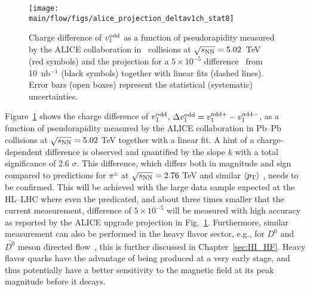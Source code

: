 \begin{figure}[!htb]
\begin{center}
\texttt{[image: \\main/flow/figs/alice\_projection\_deltav1ch\_stat8]}
\caption{
Charge difference of $v_1^{\rm odd}$ as a function of pseudorapidity measured 
  by the ALICE collaboration in \pbpb\ collisions at $\sqrt{s_{\mathrm{NN}}}=5.02$~TeV~\cite{Margutti:2017lup} 
  (red symbols) and the projection for a $5 \times 10^{-5}$ difference~\cite{Gursoy:2014aka} 
  from 10~nb$^{-1}$ (black symbols) together with linear fits (dashed lines). 
Error bars (open boxes) represent the statistical (systematic) uncertainties.}
\label{fig:alice_delta_v1}
\end{center}
\end{figure}


Figure~\ref{fig:alice_delta_v1} shows the charge difference of $v_1^{\rm odd}$, 
$\Delta v_1^{\rm odd}=v_1^{\rm odd +} - v_1^{\rm odd -}$, as a function of pseudorapidity measured by the ALICE collaboration in Pb--Pb collisions 
at $\sqrt{s_{\mathrm{NN}}}=5.02$ TeV \cite{Margutti:2017lup} together with a linear fit. A hint of a charge-dependent difference is observed and quantified 
by the slope $k$ with a total significance of 2.6 $\sigma$. This difference, which differs both in magnitude and sign compared to predictions for 
$\pi^{\pm}$ at $\sqrt{s_{\mathrm{NN}}}=2.76$ TeV and similar $\langle p_{\rm T} \rangle$ \cite{Gursoy:2014aka}, needs to be confirmed. 
This will be achieved 
with the large data sample expected at the HL--LHC where even the predicated, and about three times smaller that the current measurement,
difference of $5 \times 10^{-5}$ will be measured with high accuracy 
as reported by the ALICE upgrade projection in Fig.~\ref{fig:alice_delta_v1}. Furthermore, similar measurement can also be performed
in the heavy flavor sector, e.g., for $D^{0}$ and $\overline{D^{0}}$ meson directed flow~\cite{Das:2016cwd}, this is further discussed in Chapter~\ref{sec:HI_HF}. 
Heavy flavor quarks have the advantage of being produced at a very early stage, and thus potentially have a better sensitivity to the magnetic field at its peak magnitude before it decays.




